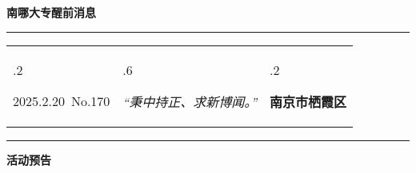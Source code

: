 \documentclass[letterpaper, 12pt]{article}
\begin{document}
\begin{center}
    \Huge\textbf{南哪大专醒前消息}
\end{center}
\vspace{4mm}
\hrule
\renewcommand\tabularxcolumn[1]{m{#1}}
\begin{tabularx}{\textwidth}{>{\hsize.2\hsize}X>{\hsize.6\hsize}X>{\hsize.2\hsize}X}
    \begin{flushleft}
        2025.2.20\, No.170
    \end{flushleft}
    &
    \begin{center}
        \textit{“秉中持正、求新博闻。”}
    \end{center}
    &
    \begin{flushright}
        \textbf{南京市栖霞区}
    \end{flushright}
\end{tabularx}
\vspace{-3.5mm}
\hrule
\vspace{4mm}
\centerline{\huge\textbf{活动预告}}
\end{document}
